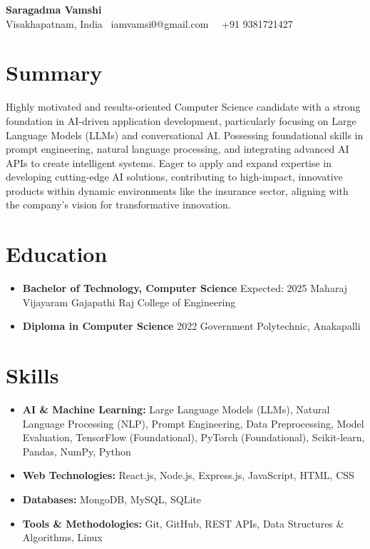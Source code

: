 \documentclass[11pt]{article}
\newcommand{\contactinfo}[3]{%
  \begin{center}
    \textbf{\Large #1}\\[5pt]
    #2 \textbar\ #3
  \end{center}
  \vspace{-10pt} %
}
\begin{document}
\contactinfo{Saragadma Vamshi}{Visakhapatnam, India \textbar\ iamvamsi0@gmail.com}{\textbar\ +91 9381721427}

\section*{Summary}
Highly motivated and results-oriented Computer Science candidate with a strong foundation in AI-driven application development, particularly focusing on Large Language Models (LLMs) and conversational AI. Possessing foundational skills in prompt engineering, natural language processing, and integrating advanced AI APIs to create intelligent systems. Eager to apply and expand expertise in developing cutting-edge AI solutions, contributing to high-impact, innovative products within dynamic environments like the insurance sector, aligning with the company's vision for transformative innovation.

\section*{Education}
\begin{itemize}[leftmargin=*,labelsep=0.5em]
    \item \textbf{Bachelor of Technology, Computer Science} \hfill Expected: 2025
    Maharaj Vijayaram Gajapathi Raj College of Engineering
    \item \textbf{Diploma in Computer Science} \hfill 2022
    Government Polytechnic, Anakapalli
\end{itemize}

\section*{Skills}
\begin{itemize}[leftmargin=*,labelsep=0.5em]
    \item \textbf{AI \& Machine Learning:} Large Language Models (LLMs), Natural Language Processing (NLP), Prompt Engineering, Data Preprocessing, Model Evaluation, TensorFlow (Foundational), PyTorch (Foundational), Scikit-learn, Pandas, NumPy, Python
    \item \textbf{Web Technologies:} React.js, Node.js, Express.js, JavaScript, HTML, CSS
    \item \textbf{Databases:} MongoDB, MySQL, SQLite
    \item \textbf{Tools \& Methodologies:} Git, GitHub, REST APIs, Data Structures & Algorithms, Linux
\end{itemize}
\end{document}
